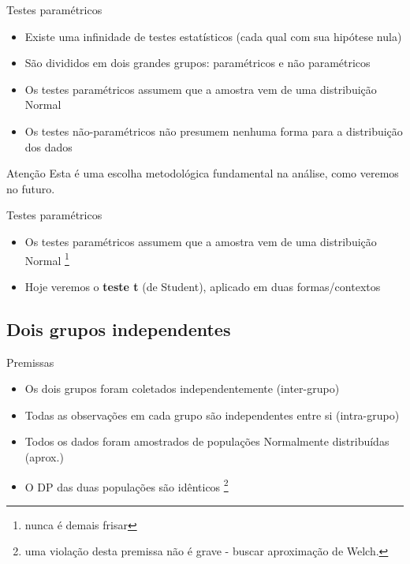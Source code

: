 \documentclass{beamer}
\begin{document}
\begin{frame}{Testes paramétricos}
  \begin{itemize}
  \item Existe uma infinidade de testes estatísticos (cada qual com sua hipótese nula)
  \item São divididos em dois grandes grupos: paramétricos e não paramétricos
  \item Os testes paramétricos assumem que a amostra vem de uma \alert{distribuição Normal}
  \item Os testes não-paramétricos não presumem nenhuma forma para a distribuição dos dados
  \end{itemize}
  \begin{block}{Atenção}
    Esta é uma escolha metodológica fundamental na análise, como veremos no futuro.
  \end{block}
\end{frame}

\begin{frame}{Testes paramétricos}
  \begin{itemize}
  \item Os testes paramétricos assumem que a amostra vem de uma \alert{distribuição Normal} \footnote{nunca é demais frisar}
  \item Hoje veremos o {\bf teste t} (de Student), aplicado em duas formas/contextos
  \end{itemize}
\end{frame}

\subsection{Dois grupos independentes}

\begin{frame}{Premissas}
  \begin{itemize}
  \item Os dois grupos foram coletados independentemente (inter-grupo)
  \item Todas as observações em cada grupo são independentes entre si (intra-grupo)
  \item Todos os dados foram amostrados de populações Normalmente distribuídas (aprox.)
  \item O DP das duas populações são idênticos \footnote{uma violação desta premissa não é grave - buscar aproximação de Welch.}
  \end{itemize}
\end{frame}
\end{document}
